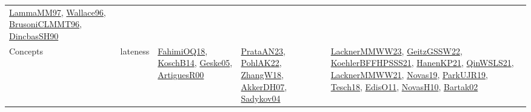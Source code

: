 {\begin{longtable}{lp{3cm}>{\raggedright}p{6cm}>{\raggedright}p{6cm}p{8cm}}
\href{articles/LammaMM97.pdf}{LammaMM97}\cite{LammaMM97}, \href{articles/Wallace96.pdf}{Wallace96}\cite{Wallace96}, \href{papers/BrusoniCLMMT96.pdf}{BrusoniCLMMT96}\cite{BrusoniCLMMT96}, \href{articles/DincbasSH90.pdf}{DincbasSH90}\cite{DincbasSH90}\\
Concepts & lateness & \href{articles/FahimiOQ18.pdf}{FahimiOQ18}\cite{FahimiOQ18}, \href{papers/KoschB14.pdf}{KoschB14}\cite{KoschB14}, \href{papers/Geske05.pdf}{Geske05}\cite{Geske05}, \href{articles/ArtiguesR00.pdf}{ArtiguesR00}\cite{ArtiguesR00} & \href{articles/PrataAN23.pdf}{PrataAN23}\cite{PrataAN23}, \href{articles/PohlAK22.pdf}{PohlAK22}\cite{PohlAK22}, \href{articles/ZhangW18.pdf}{ZhangW18}\cite{ZhangW18}, \href{papers/AkkerDH07.pdf}{AkkerDH07}\cite{AkkerDH07}, \href{papers/Sadykov04.pdf}{Sadykov04}\cite{Sadykov04} & \href{articles/LacknerMMWW23.pdf}{LacknerMMWW23}\cite{LacknerMMWW23}, \href{papers/GeitzGSSW22.pdf}{GeitzGSSW22}\cite{GeitzGSSW22}, \href{articles/KoehlerBFFHPSSS21.pdf}{KoehlerBFFHPSSS21}\cite{KoehlerBFFHPSSS21}, \href{papers/HanenKP21.pdf}{HanenKP21}\cite{HanenKP21}, \href{articles/QinWSLS21.pdf}{QinWSLS21}\cite{QinWSLS21}, \href{papers/LacknerMMWW21.pdf}{LacknerMMWW21}\cite{LacknerMMWW21}, \href{articles/Novas19.pdf}{Novas19}\cite{Novas19}, \href{papers/ParkUJR19.pdf}{ParkUJR19}\cite{ParkUJR19}, \href{papers/Tesch18.pdf}{Tesch18}\cite{Tesch18}, \href{papers/EdisO11.pdf}{EdisO11}\cite{EdisO11}, \href{articles/NovasH10.pdf}{NovasH10}\cite{NovasH10}, \href{papers/Bartak02.pdf}{Bartak02}\cite{Bartak02}\\

\end{longtable}}
